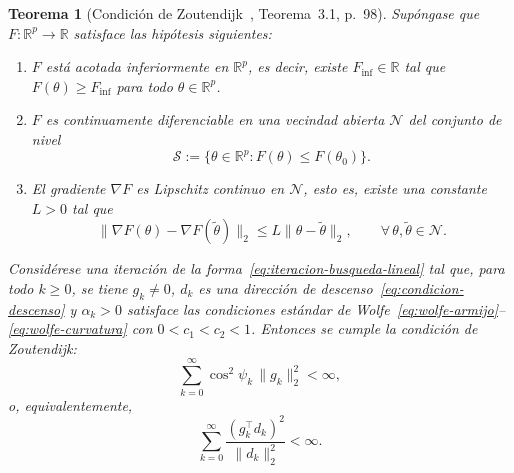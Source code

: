 \documentclass[a4paper,openany,oneside,10pt]{report}
\theoremstyle{pnlTeorema}
\newtheorem{teorema}{Teorema}[section]
\theoremstyle{pnlDefinicion}
\theoremstyle{pnlObservacion}
\begin{document}
\begin{teorema}[Condición de Zoutendijk~\cite{andrei2020}, Teorema~3.1, p.~98]
\label{thm:zoutendijk}
Supóngase que $F:\mathbb{R}^p\to\mathbb{R}$ satisface las hipótesis siguientes:
\begin{enumerate}
\item $F$ está acotada inferiormente en $\mathbb{R}^p$, es decir, existe
$F_{\inf}\in\mathbb{R}$ tal que $F(\theta)\ge F_{\inf}$ para todo
$\theta\in\mathbb{R}^p$.
\item $F$ es continuamente diferenciable en una vecindad abierta $\mathcal{N}$
del conjunto de nivel
\[
\mathcal{S}:=\{\theta\in\mathbb{R}^p : F(\theta)\le F(\theta_0)\}.
\]
\item El gradiente $\nabla F$ es Lipschitz continuo en $\mathcal{N}$, esto es,
existe una constante $L>0$ tal que
\begin{equation}\label{eq:gradiente-lipschitz}
\|\nabla F(\theta)-\nabla F(\tilde\theta)\|_2
\le L\|\theta-\tilde\theta\|_2,
\qquad \forall\,\theta,\tilde\theta\in\mathcal{N}.
\end{equation}
\end{enumerate}
Considérese una iteración de la forma~\eqref{eq:iteracion-busqueda-lineal} tal
que, para todo $k\ge 0$, se tiene $g_k\neq 0$, $d_k$ es una dirección de
descenso~\eqref{eq:condicion-descenso} y $\alpha_k>0$ satisface las condiciones
estándar de Wolfe~\eqref{eq:wolfe-armijo}--\eqref{eq:wolfe-curvatura} con
$0<c_1<c_2<1$. Entonces se cumple la \emph{condición de Zoutendijk}:
\begin{equation}\label{eq:zoutendijk}
\sum_{k=0}^{\infty}\cos^2\psi_k\,\|g_k\|_2^2 < \infty,
\end{equation}
o, equivalentemente,
\begin{equation}\label{eq:zoutendijk-equiv}
\sum_{k=0}^{\infty}\frac{(g_k^\top d_k)^2}{\|d_k\|_2^2} < \infty.
\end{equation}
\end{teorema}
\end{document}

